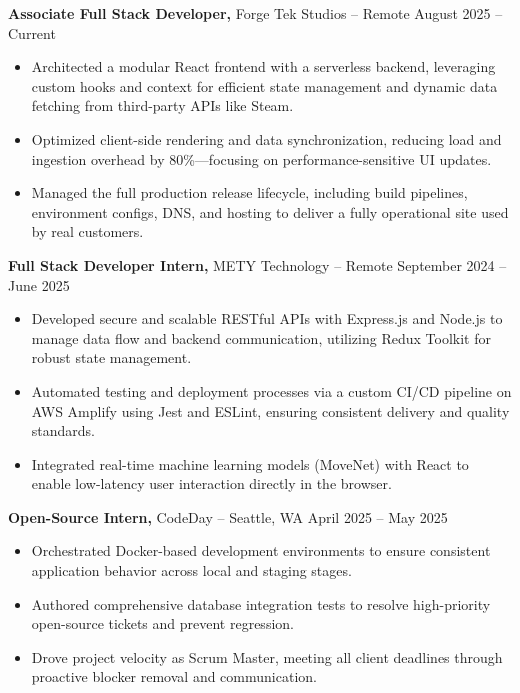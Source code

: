 \documentclass[11pt]{article}       %
\begin{document}
\textbf{Associate Full Stack Developer,} {Forge Tek Studios} -- Remote \hfill August 2025 -- Current 
\vspace{-9pt}
\begin{itemize}
  \item Architected a modular React frontend with a serverless backend, leveraging custom hooks and context for efficient state management and dynamic data fetching from third-party APIs like Steam.
  \item Optimized client-side rendering and data synchronization, reducing load and ingestion overhead by 80\%—focusing on performance-sensitive UI updates.
  \item Managed the full production release lifecycle, including build pipelines, environment configs, DNS, and hosting to deliver a fully operational site used by real customers.
\end{itemize}

\textbf{Full Stack Developer Intern,} {METY Technology} -- Remote \hfill September 2024 -- June 2025 
\vspace{-9pt}
\begin{itemize}
  \item Developed secure and scalable RESTful APIs with Express.js and Node.js to manage data flow and backend communication, utilizing Redux Toolkit for robust state management.
  \item Automated testing and deployment processes via a custom CI/CD pipeline on AWS Amplify using Jest and ESLint, ensuring consistent delivery and quality standards.
  \item Integrated real-time machine learning models (MoveNet) with React to enable low-latency user interaction directly in the browser.
\end{itemize}

\textbf{Open-Source Intern,} {CodeDay} -- Seattle, WA \hfill April 2025 -- May 2025 \\
\vspace{-9pt}
\begin{itemize}
  \item Orchestrated Docker-based development environments to ensure consistent application behavior across local and staging stages.
  \item Authored comprehensive database integration tests to resolve high-priority open-source tickets and prevent regression.
  \item Drove project velocity as Scrum Master, meeting all client deadlines through proactive blocker removal and communication.
\end{itemize}
\end{document}
